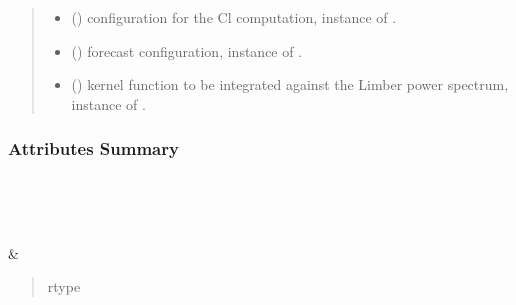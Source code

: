 \documentclass[letterpaper,10pt,english]{sphinxmanual}
\begin{document}
\begin{fulllineitems}
\begin{quote}
\begin{description}
\begin{itemize}
\item {} 
\sphinxAtStartPar
{} (\sphinxcode{\sphinxupquote{Optional}}{[}\sphinxcode{\sphinxupquote{AngularConfig}}{]}) \textendash{} configuration for the Cl computation, instance of .

\item {} 
\sphinxAtStartPar
{} (\sphinxcode{\sphinxupquote{Optional}}{[}\sphinxcode{\sphinxupquote{ForecastConfig}}{]}) \textendash{} forecast configuration, instance of .

\item {} 
\sphinxAtStartPar
{} (\sphinxcode{\sphinxupquote{Optional}}{[}\sphinxcode{\sphinxupquote{KernelFunction}}{]}) \textendash{} kernel function to be integrated against the Limber power spectrum, instance of
.

\end{itemize}

\end{description}\end{quote}
\subsubsection*{Attributes Summary}


\begin{savenotes}\sphinxatlongtablestart\begin{longtable}[c]{}
\hline

\endfirsthead

%
{}\\
\hline

\endhead

\hline
{}\\
\endfoot

\endlastfoot

\sphinxAtStartPar
{\hyperref[\detokenize{api/seyfert.cosmology.c_ells.AngularCoefficient:seyfert.cosmology.c_ells.AngularCoefficient.integ_method}]{}}
&
\sphinxAtStartPar
\begin{quote}\begin{description}
\item[{rtype}] \leavevmode
\sphinxAtStartPar
{}


\end{description}
\end{quote}
\end{longtable}
\end{savenotes}
\end{fulllineitems}
\end{document}
